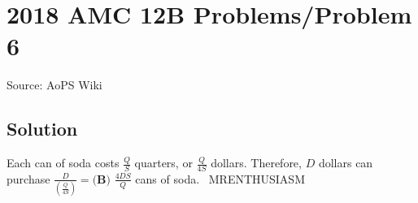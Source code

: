 \documentclass[12pt]{article}
\begin{document}
\section*{{2018 AMC 12B Problems/Problem 6}}
Source: AoPS Wiki

\subsection*{Solution}
Each can of soda costs $\frac QS$ quarters, or $\frac{Q}{4S}$ dollars. Therefore, $D$ dollars can purchase $\frac{D}{\left(\tfrac{Q}{4S}\right)}=\boxed{\textbf{(B) } \frac{4DS}{Q}}$ cans of soda. ~MRENTHUSIASM
\end{document}
